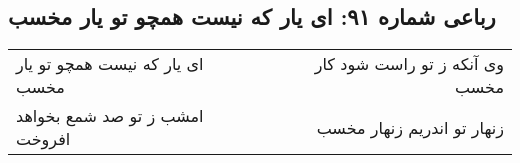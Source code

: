 \begin{center}
\section*{رباعی شماره ۹۱: ای یار که نیست همچو تو یار مخسب}
\label{sec:0091}
\begin{longtable}{l p{0.5cm} r}
ای یار که نیست همچو تو یار مخسب
&&
وی آنکه ز تو راست شود کار مخسب
\\
امشب ز تو صد شمع بخواهد افروخت
&&
زنهار تو اندریم زنهار مخسب
\\
\end{longtable}
\end{center}
